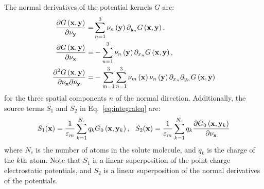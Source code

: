 \documentclass[12pt,titlepage]{article}
\begin{document}
%
The normal derivatives of the potential kernels $G$ are:
%
\begin{equation}
\begin{split}
\frac{\partial G\left({\bf x}, {\bf y}\right)}{\partial \nu_{\bf y}} =& \sum\limits_{n=1}^{3} \nu_n\left({\bf y}\right)\partial_{y_n}G\left({\bf x}, {\bf y}\right), \\
\frac{\partial G\left({\bf x}, {\bf y}\right)}{\partial \nu_{\bf x}} =& -\sum\limits_{n=1}^{3} \nu_n\left({\bf y}\right)\partial_{x_n}G\left({\bf x}, {\bf y}\right), \\
\frac{\partial^2 G\left({\bf x}, {\bf y}\right)}{\partial \nu_{\bf x}\partial \nu_{\bf y}} =& -\sum\limits_{m=1}^{3}\sum\limits_{n=1}^{3} \nu_m\left({\bf x}\right)\nu_n\left({\bf y}\right)\partial_{x_n}\partial_{y_n}G\left({\bf x}, {\bf y}\right) 
\end{split} \end{equation}
%
for the three spatial components $n$ of the normal direction. Additionally, the source terms $S_1$ and $S_2$ in Eq.~\ref{eq:integraleq} are:
%
\begin{equation}
S_1({\bf x}) = \frac{1}{\varepsilon_m}\sum\limits_{k=1}^{N_c}q_k G_0\left({\bf x}, {\bf y}_k\right), \ \ S_2({\bf x}) = \frac{1}{\varepsilon_m}\sum\limits_{k=1}^{N_c}q_k \frac{\partial G_0\left({\bf x}, {\bf y}_k\right)}{\partial \nu_{\bf x}}
\end{equation}
%
where $N_c$ is the number of atoms in the solute molecule, and $q_k$ is the charge of the $k$th atom. Note that $S_1$ is a linear superposition of the point charge electrostatic potentials, and $S_2$ is a linear superposition of the normal derivatives of the potentials.
\end{document}
